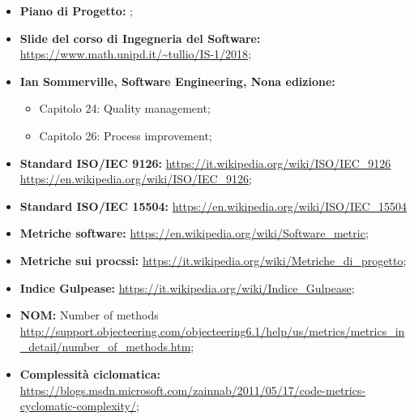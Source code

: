 \begin{itemize}
	\item \textbf{Piano di Progetto:} \PdP;
	\item \textbf{Slide del corso di Ingegneria del Software:}\newline
		  		 \url{https://www.math.unipd.it/~tullio/IS-1/2018};
	\item \textbf{Ian Sommerville, Software Engineering, Nona edizione:}
		\begin{itemize}
		  	\item Capitolo 24: Quality management;
		  	\item Capitolo 26: Process improvement;
		\end{itemize}
	\item \textbf{Standard ISO/IEC 9126:}\newline
		  		  \url{https://it.wikipedia.org/wiki/ISO/IEC_9126}\newline
				  \url{https://en.wikipedia.org/wiki/ISO/IEC_9126};
	\item \textbf{Standard ISO/IEC 15504:}\newline
				  \url{https://en.wikipedia.org/wiki/ISO/IEC_15504}
	\item \textbf{Metriche software:}\newline
				  \url{https://en.wikipedia.org/wiki/Software_metric};
	\item \textbf{Metriche sui procssi:}\newline
				  \url{https://it.wikipedia.org/wiki/Metriche_di_progetto};
	\item \textbf{Indice Gulpease:}\newline
				 \url{https://it.wikipedia.org/wiki/Indice_Gulpease};
	\item \textbf{NOM:} Number of methods\newline
				  \url{http://support.objecteering.com/objecteering6.1/help/us/metrics/metrics_in_detail/number_of_methods.htm};
	\item \textbf{Complessità ciclomatica: }\newline
				 \url{https://blogs.msdn.microsoft.com/zainnab/2011/05/17/code-metrics-cyclomatic-complexity/};
		
\end{itemize}